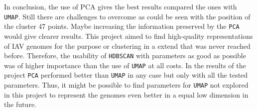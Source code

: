 In conclusion, the use of PCA gives the best results compared the ones with \texttt{UMAP}. Still there are challenges to overcome as could be seen with the position of the cluster 47 points. Maybe increasing the information preserved by the \texttt{PCA} would give clearer results. This project aimed to find high-quality representations of \gls{IAV} genomes for the purpose or clustering in a extend that was never reached before. Therefore, the usability of \texttt{HDBSCAN} with parameters as good as possible was of higher importance than the use of \texttt{UMAP} at all costs. In the results of the project \texttt{PCA} performed better than \texttt{UMAP} in any case but only with all the tested parameters. Thus, it might be possible to find parameters for \texttt{UMAP} not explored in this project to represent the genomes even better in a equal low dimension in the future.